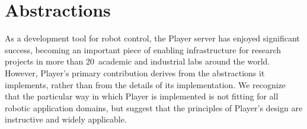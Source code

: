 \documentclass[letterpaper, 10 pt, conference]{iros03}
\def\numlabs{20\ }
\begin{document}








\section{Abstractions}
As a development tool for robot control, the Player server has enjoyed
significant success, becoming an important piece of enabling
infrastructure for research projects in more than \numlabs academic
and industrial labs around the world.  However, Player's primary
contribution derives from the abstractions it implements, rather than
from the details of its implementation.  We recognize that the
particular way in which Player is implemented is not fitting for all
robotic application domains, but suggest that the principles of
Player's design are instructive and widely applicable.
\end{document}
